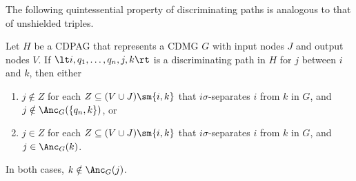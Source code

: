 The following quintessential property of discriminating paths is analogous to that of unshielded triples. 
\begin{Prp}\label{prp:orienting_discriminating_paths}
  Let $H$ be a CDPAG that represents a CDMG $G$ with input nodes $J$ and output nodes $V$.
  If $\lt i, q_1, \dots, q_n, j, k \rt$ is a discriminating path in $H$ for $j$ between $i$ and $k$, then
  either 
  \begin{enumerate}[label=(\roman*)]
    \item $j \notin Z$ for each $Z \subseteq (V \cup J) \sm \{i,k\}$ that $i\sigma$-separates $i$ from $k$ in $G$, and $j \notin \Anc_G(\{q_n,k\})$, or
    \item $j \in Z$ for each $Z \subseteq (V \cup J) \sm \{i,k\}$ that $i\sigma$-separates $i$ from $k$ in $G$, and $j \in \Anc_G(k)$.
  \end{enumerate}
  In both cases, $k \notin \Anc_G(j)$.
\end{Prp}
